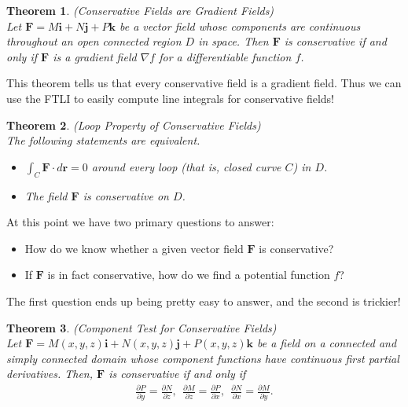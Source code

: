\documentclass[12pt, letter]{article}
\theoremstyle{plain}
\newtheorem{theorem}{Theorem}
\numberwithin{theorem}{section}
\theoremstyle{definition}
\begin{document}
\bigskip

\hrulefill

\bigskip

\begin{theorem}{(Conservative Fields are Gradient Fields)}
\\
Let $\bm{F} = M\bm{i}+N\bm{j}+P\bm{k}$ be a vector field whose components are continuous throughout an open connected region $D$ in space. Then $\bm{F}$ is conservative if and only if $\bm{F}$ is a gradient field $\nabla f$ for a differentiable function $f$.
\end{theorem}

\bigskip

This theorem tells us that every conservative field is a gradient field. Thus we can use the FTLI to easily compute line integrals for conservative fields!

\bigskip

\hrulefill

\bigskip

\begin{theorem}{(Loop Property of Conservative Fields)}
\\
The following statements are equivalent.
\begin{itemize}
\item[1.] $\int_C \bm{F}\cdot d\bm{r} =0$ around every loop (that is, closed curve $C$) in $D$.
\item[2.] The field $\bm{F}$ is conservative on $D$.
\end{itemize}
\end{theorem}

\bigskip

\hrulefill

\bigskip

At this point we have two primary questions to answer:
\begin{itemize}
\item[1.] How do we know whether a given vector field $\bm{F}$ is conservative?
\item[2.] If $\bm{F}$ is in fact conservative, how do we find a potential function $f$?
\end{itemize}

\bigskip

The first question ends up being pretty easy to answer, and the second is trickier!

\bigskip

\hrulefill

\bigskip

\begin{theorem}{(Component Test for Conservative Fields)}
\\
Let $\bm{F} = M(x,y,z)\bm{i}+N(x,y,z)\bm{j}+P(x,y,z)\bm{k}$ be a field on a connected and simply connected domain whose component functions have continuous first partial derivatives. Then, $\bm{F}$ is conservative if and only if
\begin{align*}
\frac{\partial P}{\partial y} = \frac{\partial N}{\partial z}, \ \ \frac{\partial M}{\partial z}=\frac{\partial P}{\partial x}, \ \ \frac{\partial N}{\partial x}=\frac{\partial M}{\partial y}.
\end{align*}
\end{theorem}
\end{document}
